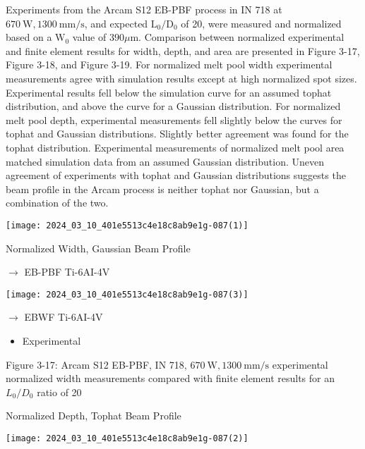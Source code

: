 \documentclass[10pt]{article}
\begin{document}
Experiments from the Arcam S12 EB-PBF process in IN 718 at $670 \mathrm{~W}, 1300 \mathrm{~mm} / \mathrm{s}$, and expected $\mathrm{L}_{0} / \mathrm{D}_{0}$ of 20, were measured and normalized based on a $\mathrm{W}_{0}$ value of $390 \mu \mathrm{m}$. Comparison between normalized experimental and finite element results for width, depth, and area are presented in Figure 3-17, Figure 3-18, and Figure 3-19. For normalized melt pool width experimental measurements agree with simulation results except at high normalized spot sizes. Experimental results fell below the simulation curve for an assumed tophat distribution, and above the curve for a Gaussian distribution. For normalized melt pool depth, experimental measurements fell slightly below the curves for tophat and Gaussian distributions. Slightly better agreement was found for the tophat distribution. Experimental measurements of normalized melt pool area matched simulation data from an assumed Gaussian distribution. Uneven agreement of experiments with tophat and Gaussian distributions suggests the beam profile in the Arcam process is neither tophat nor Gaussian, but a combination of the two.

\begin{center}
\texttt{[image: 2024\_03\_10\_401e5513c4e18c8ab9e1g-087(1)]}
\end{center}

Normalized Width, Gaussian Beam Profile

$\longrightarrow$ EB-PBF Ti-6AI-4V

\begin{center}
\texttt{[image: 2024\_03\_10\_401e5513c4e18c8ab9e1g-087(3)]}
\end{center}

$\longrightarrow$ EBWF Ti-6AI-4V

\begin{itemize}
  \item Experimental
\end{itemize}

Figure 3-17: Arcam S12 EB-PBF, IN 718, $670 \mathrm{~W}, 1300 \mathrm{~mm} / \mathrm{s}$ experimental normalized width measurements compared with finite element results for an $L_{0} / D_{0}$ ratio of 20

Normalized Depth, Tophat Beam Profile

\begin{center}
\texttt{[image: 2024\_03\_10\_401e5513c4e18c8ab9e1g-087(2)]}
\end{center}
\end{document}
